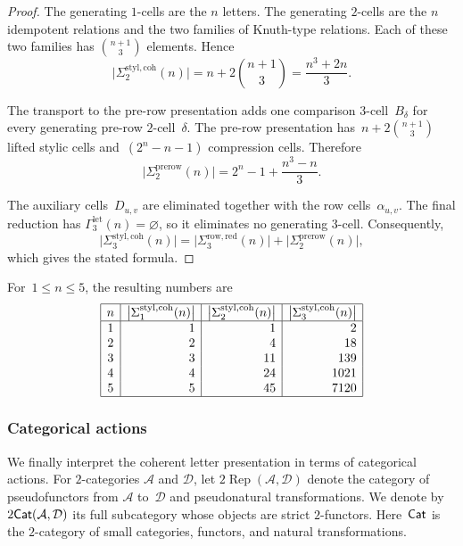 \documentclass[a4paper, twoside, 11pt, english]{article}
\begin{document}
\begin{proof}
The generating $1$-cells are the $n$ letters. The generating $2$-cells
are the $n$ idempotent relations and the two families of Knuth-type
relations. Each of these two families has
$\binom{n+1}{3}$ elements. Hence
\[
\bigl|\Sigma^{\mathrm{styl,coh}}_2(n)\bigr|
=
n+2\binom{n+1}{3}
=
\frac{n^3+2n}{3}.
\]

The transport to the pre-row presentation adds one comparison
$3$-cell~$B_\delta$ for every generating pre-row $2$-cell~$\delta$.
The pre-row presentation has~$\displaystyle
n+2\binom{n+1}{3}$
lifted stylic cells and~$(2^n-n-1)$
compression cells. Therefore
\[
\bigl|\Sigma^{\mathrm{prerow}}_2(n)\bigr|
=
2^n-1+\frac{n^3-n}{3}.
\]

The auxiliary cells~$D_{u,v}$ are eliminated together with the row
cells~$\alpha_{u,v}$. The final reduction has
$\Gamma^{\mathrm{let}}_3(n)=\varnothing$, so it eliminates no
generating $3$-cell. Consequently,
\[
\bigl|\Sigma^{\mathrm{styl,coh}}_3(n)\bigr|
=
\bigl|\Sigma^{\mathrm{row,red}}_3(n)\bigr|
+
\bigl|\Sigma^{\mathrm{prerow}}_2(n)\bigr|,
\]
which gives the stated formula.
\end{proof}

\begin{example}
For~$1\leq n\leq5$, the resulting numbers are
\[
\begin{array}{|c|r|r|r|}
\hline
n
&
\bigl|\Sigma^{\mathrm{styl,coh}}_1(n)\bigr|
&
\bigl|\Sigma^{\mathrm{styl,coh}}_2(n)\bigr|
&
\bigl|\Sigma^{\mathrm{styl,coh}}_3(n)\bigr|
\\ \hline
1&1&1&2\\
2&2&4&18\\
3&3&11&139\\
4&4&24&1021\\
5&5&45&7120\\
\hline
\end{array}
\]
\end{example}


\subsubsection{Categorical actions}
\label{SSS:CategoricalActions}

We finally interpret the coherent letter presentation in terms of
categorical actions.
For $2$-categories $\mathcal A$ and $\mathcal D$, let
$2\operatorname{Rep}(\mathcal A,\mathcal D)$ denote the category of
pseudofunctors from $\mathcal A$ to~$\mathcal D$ and pseudonatural
transformations. We denote by~$2\mathbf{\mathsf{Cat}}(\mathcal A,\mathcal D)$ its full subcategory whose objects are
strict $2$-functors. Here~$\mathbf{\mathsf{Cat}}$ is the $2$-category of small
categories, functors, and natural transformations.
\end{document}
